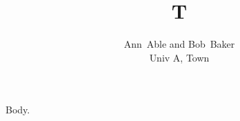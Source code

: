 \documentclass[journal]{IEEEtran}
\begin{document}
\title{T}
\author{Ann~Able and Bob~Baker\\
Univ A, Town\\
}
\maketitle
Body.
\end{document}
